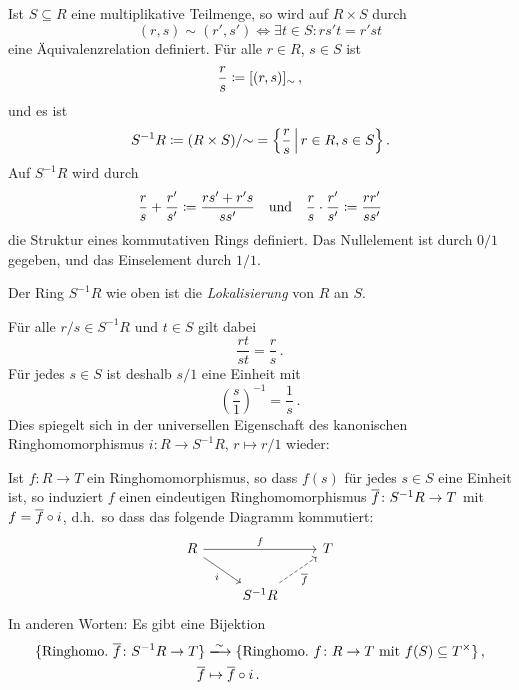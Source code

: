 Ist $S \subseteq R$ eine multiplikative Teilmenge, so wird auf $R \times S$ durch
\begin{equation}
\label{equation: formula for localization}
        (r,s) \sim (r', s')
  \iff  \exists t \in S:
        rs't = r'st
\end{equation}
eine Äquivalenzrelation definiert.
Für alle $r \in R$, $s \in S$ ist
\[
            \frac{r}{s}
  \coloneqq  [(r,s)]_{\sim} \,,
\]
und es ist
\[
            S^{-1} R
  \defined  (R \times S)/{\sim}
  =         \left\{
              \frac{r}{s}
            \suchthat*
              r \in R,
              s \in S
            \right\}.
\]
Auf $S^{-1} R$ wird durch
\[
              \frac{r}{s}
            + \frac{r'}{s'}
  \coloneqq  \frac{rs' + r's}{ss'}
  \quad\text{und}\quad
                  \frac{r}{s}
            \cdot \frac{r'}{s'}
  \coloneqq  \frac{rr'}{ss'}
\]
die Struktur eines kommutativen Rings definiert.
Das Nullelement ist durch $0/1$ gegeben, und das Einselement durch $1/1$.

\begin{definition}
  Der Ring $S^{-1} R$ wie oben ist die \emph{Lokalisierung} von $R$ an $S$.
\end{definition}


Für alle $r/s \in S^{-1} R$ und $t \in S$ gilt dabei
\[
    \frac{rt}{st}
  = \frac{r}{s} \,.
\]
Für jedes $s \in S$ ist deshalb $s/1$ eine Einheit mit
\[
    \left( \frac{s}{1} \right)^{-1}
  = \frac{1}{s} \,.
\]
Dies spiegelt sich in der universellen Eigenschaft des kanonischen Ringhomomorphismus $i \colon R \to S^{-1} R$, $r \mapsto r/1$ wieder:

\begin{theorem}
  Ist $f \colon R \to T$ ein Ringhomomorphismus, so dass $f(s)$ für jedes $s \in S$ eine Einheit ist, so induziert $f$ einen eindeutigen Ringhomomorphismus $\overline{f} \colon S^{-1} R \to T$ mit $f = \overline{f} \circ i$, d.h.\ so dass das folgende Diagramm kommutiert:
  \[
    \begin{tikzcd}
        R
        \arrow{rr}[above]{f}
        \arrow{dr}[below left]{i}
      & {}
      & T
      \\
        {}
      & S^{-1} R
        \arrow[dashed]{ur}[below right]{\induced{f}}
      & {}
    \end{tikzcd}
  \]
  In anderen Worten:
  Es gibt eine Bijektion
  \begin{align*}
                            \{ \text{Ringhomo.\ $\induced{f} \colon S^{-1} R \to T$} \}
    &\xlongrightarrow{\sim} \{ \text{Ringhomo.\ $f \colon R \to T$ mit $f(S) \subseteq \unitgroup{T}$} \} \,,  \\
                            \induced{f}
    &\mapsto                \induced{f} \circ i \,.
  \end{align*}
\end{theorem}

